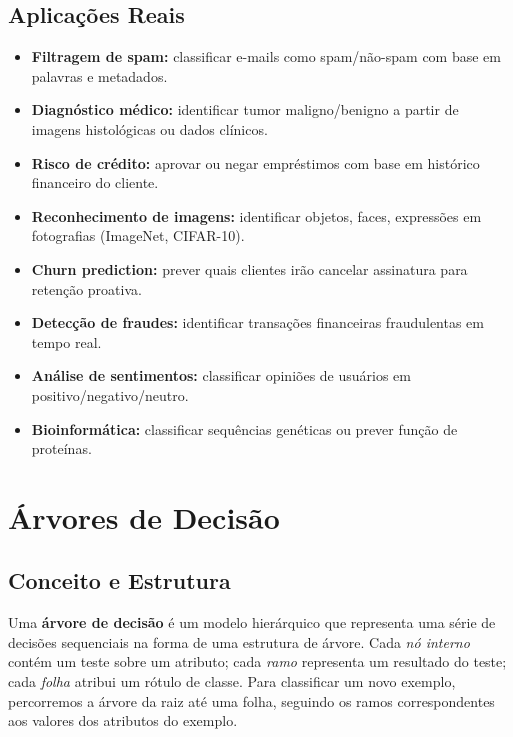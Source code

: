 \documentclass[12pt,a4paper]{article}
\begin{document}
\subsection{Aplicações Reais}

\begin{itemize}
  \item {} \textbf{Filtragem de spam:} classificar e-mails como spam/não-spam com base em palavras e metadados.
  \item {} \textbf{Diagnóstico médico:} identificar tumor maligno/benigno a partir de imagens histológicas ou dados clínicos.
  \item {} \textbf{Risco de crédito:} aprovar ou negar empréstimos com base em histórico financeiro do cliente.
  \item {} \textbf{Reconhecimento de imagens:} identificar objetos, faces, expressões em fotografias (ImageNet, CIFAR-10).
  \item {} \textbf{Churn prediction:} prever quais clientes irão cancelar assinatura para retenção proativa.
  \item {} \textbf{Detecção de fraudes:} identificar transações financeiras fraudulentas em tempo real.
  \item {} \textbf{Análise de sentimentos:} classificar opiniões de usuários em positivo/negativo/neutro.
  \item {} \textbf{Bioinformática:} classificar sequências genéticas ou prever função de proteínas.
\end{itemize}

\section{Árvores de Decisão}

\subsection{Conceito e Estrutura}

Uma \textbf{árvore de decisão} é um modelo hierárquico que representa uma série de decisões sequenciais na forma de uma estrutura de árvore. Cada \textit{nó interno} contém um teste sobre um atributo; cada \textit{ramo} representa um resultado do teste; cada \textit{folha} atribui um rótulo de classe. Para classificar um novo exemplo, percorremos a árvore da raiz até uma folha, seguindo os ramos correspondentes aos valores dos atributos do exemplo.
\end{document}
